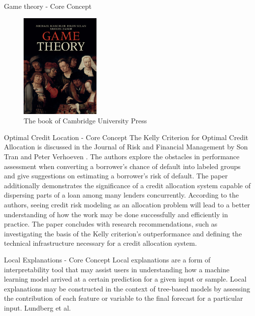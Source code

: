 \documentclass[aspectratio=169]{beamer}
\begin{document}
\begin{frame}{Game theory - Core Concept}

\begin{figure}
    \centering
    \includegraphics[width=0.35\textwidth]{figs/shap/game_theory.jpeg}
    \caption{The book of Cambridge University Press \cite{cup_2013}}
    \label{fig:game-theory}
\end{figure}
    
\end{frame}

\begin{frame}{Optimal Credit Location - Core Concept}
    The Kelly Criterion for Optimal Credit Allocation is discussed in the Journal of Risk and Financial Management by Son Tran and Peter Verhoeven \cite{Tran2021}. The authors explore the obstacles in performance assessment when converting a borrower's chance of default into labeled groups and give suggestions on estimating a borrower's risk of default. The paper additionally demonstrates the significance of a credit allocation system capable of dispersing parts of a loan among many lenders concurrently. According to the authors, seeing credit risk modeling as an allocation problem will lead to a better understanding of how the work may be done successfully and efficiently in practice. The paper concludes with research recommendations, such as investigating the basis of the Kelly criterion's outperformance and defining the technical infrastructure necessary for a credit allocation system.
\end{frame}

\begin{frame}{Local Explanations - Core Concept}
    Local explanations are a form of interpretability tool that may assist users in understanding how a machine learning model arrived at a certain prediction for a given input or sample. Local explanations may be constructed in the context of tree-based models by assessing the contribution of each feature or variable to the final forecast for a particular input. Lundberg et al. \cite{Lundberg2020}

\end{frame}
\end{document}
